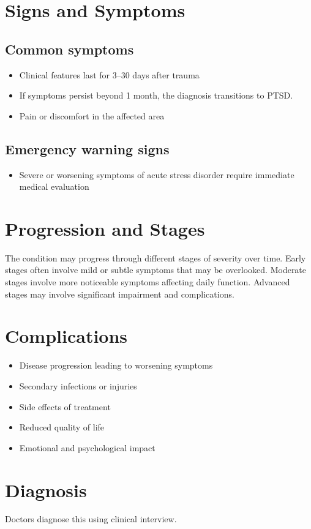 \section{Signs and Symptoms}

\subsection{Common symptoms}
\begin{itemize}[noitemsep]
  \item Clinical features last for 3--30 days after trauma
  \item If symptoms persist beyond 1 month, the diagnosis transitions to PTSD.
  \item Pain or discomfort in the affected area
  \end{itemize}

\subsection{Emergency warning signs}
\begin{itemize}[noitemsep]
  \item Severe or worsening symptoms of acute stress disorder require immediate medical evaluation
\end{itemize}
\section{Progression and Stages}
The condition may progress through different stages of severity over time. Early stages often involve mild or subtle symptoms that may be overlooked. Moderate stages involve more noticeable symptoms affecting daily function. Advanced stages may involve significant impairment and complications.
\section{Complications}
\begin{itemize}[noitemsep]
  \item Disease progression leading to worsening symptoms
  \item Secondary infections or injuries
  \item Side effects of treatment
  \item Reduced quality of life
  \item Emotional and psychological impact
\end{itemize}
\section{Diagnosis}
Doctors diagnose this using clinical interview.

